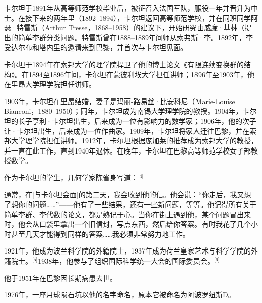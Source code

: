 卡尔坦于1891年从高等师范学校毕业后，被征召入法国军队，服役一年并晋升为中士。在接下来的两年里（1892–1894），卡尔坦返回高等师范学校，并在同班同学阿瑟·特雷斯（Arthur Tresse，1868–1958）的建议下，开始研究由威廉·基林（提出的简单李群分类问题。特雷斯曾在1888–1889年间师从索弗斯·李。1892年，李受达尔布和塔内里的邀请来到巴黎，并首次与卡尔坦见面。

卡尔坦于1894年在索邦大学的理学院捍卫了他的博士论文《有限连续变换群的结构》。在1894至1896年间，卡尔坦在蒙彼利埃大学担任讲师；1896年至1903年，他在里昂大学理学院担任讲师。

1903年，卡尔坦在里昂结婚，妻子是玛丽-路易丝·比安科尼（Marie-Louise Bianconi，1880–1950）；同年，卡尔坦成为南锡大学理学院的教授。1904年，卡尔坦的长子亨利·卡尔坦出生，后来成为一位有影响力的数学家；1906年，他的次子让·卡尔坦出生，后来成为一位作曲家。1909年，卡尔坦将家人迁往巴黎，并在索邦大学理学院担任讲师。1912年，卡尔坦根据庞加莱的推荐成为索邦大学的教授，并一直在此工作，直到1940年退休。在晚年，卡尔坦在巴黎高等师范学校女子部教授数学。

作为卡尔坦的学生，几何学家陈省身写道：\(^\text{[4]}\)

通常，在[与卡尔坦会面]的第二天，我会收到他的信。他会说：“你走后，我又想了想你的问题……”——他有了一些结果，还有一些新问题，等等。他记得所有关于简单李群、李代数的论文，都是熟记于心。当你在街上遇到他，某个问题冒出来时，他会从口袋里拿出一个旧信封，写点东西，然后给你答案。有时我花了几个小时甚至几天才能得到同样的答案……我必须非常努力地工作。

1921年，他成为波兰科学院的外籍院士，1937年成为荷兰皇家艺术与科学学院的外籍院士。\(^\text{[5]}\)1938年，他参与了组织国际科学统一大会的国际委员会。\(^\text{[6]}\)

他于1951年在巴黎因长期病患去世。

1976年，一座月球陨石坑以他的名字命名，原本它被命名为阿波罗纽斯D。
